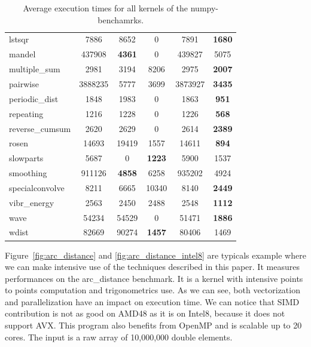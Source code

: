 \documentclass[10pt, preprint]{sigplanconf}
\begin{document}
\begin{table}
{\begin{tabular}{|l||c|c|c|c|c|}
                    lstsqr &    7886 &          8652 &             0 &          7891 & \textbf{1680} \\
                    mandel &  437908 & \textbf{4361} &             0 &        439827 &          5075 \\
             multiple\_sum &    2981 &          3194 &          8206 &          2975 & \textbf{2007} \\
                  pairwise & 3888235 &          5777 &          3699 &       3873927 & \textbf{3435} \\
            periodic\_dist &    1848 &          1983 &             0 &          1863 &  \textbf{951} \\
                 repeating &    1216 &          1228 &             0 &          1226 &  \textbf{568} \\
           reverse\_cumsum &    2620 &          2629 &             0 &          2614 & \textbf{2389} \\
                     rosen &   14693 &         19419 &          1557 &         14611 &  \textbf{894} \\
                 slowparts &    5687 &             0 & \textbf{1223} &          5900 &          1537 \\
                 smoothing &  911126 & \textbf{4858} &          6258 &        935202 &          4924 \\
           specialconvolve &    8211 &          6665 &         10340 &          8140 & \textbf{2449} \\
              vibr\_energy &    2563 &          2450 &          2488 &          2548 & \textbf{1112} \\
                      wave &   54234 &         54529 &             0 &         51471 & \textbf{1886} \\
                     wdist &   82669 &         90274 & \textbf{1457} &         80406 &          1469 \\
\hline
\end{tabular}
}
\caption{Average execution times for all kernels of the numpy-benchamrks.}
\label{tbl:overview}
\end{table}


Figure~\ref{fig:arc_distance} and \ref{fig:arc_distance_intel8} are typicals
example where we can make intensive
use of the techniques described in this paper. It measures performances on the
arc\_distance benchmark. It is a kernel with intensive points to points computation
and trigonometrics use. As we can see, both vectorization
and parallelization have an impact on execution time. We can notice that SIMD
contribution is not as good on AMD48 as it is on Intel8, because it does not
support AVX. This program also benefits from OpenMP and is scalable up to 20 cores.
The input is a raw array of 10,000,000 double elements.
\end{document}
